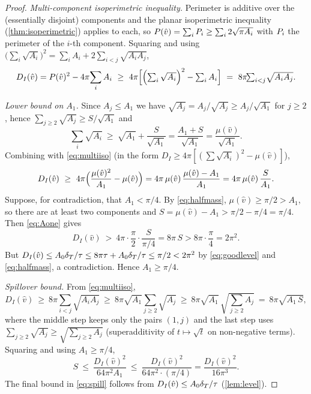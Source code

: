 \begin{proof}
\emph{Multi-component isoperimetric inequality.} Perimeter is additive over
the (essentially disjoint) components and the planar isoperimetric
inequality (\cref{thm:isoperimetric}) applies to each, so
$P(\hat v)=\sum_iP_i\ge\sum_i 2\sqrt{\pi A_i}$ with $P_i$ the
perimeter of the $i$-th component. Squaring and using
$\bigl(\sum_i\sqrt{A_i}\bigr)^2=\sum_iA_i+2\sum_{i<j}\sqrt{A_iA_j}$,
\begin{equation}\label{eq:multiiso}
   D_I(\hat v)=\Per(\hat v)^2-4\pi\!\sum_iA_i
   \ \ge\ 4\pi\Bigl[\Bigl(\textstyle\sum_i\sqrt{A_i}\Bigr)^2-\sum_iA_i\Bigr]
   \ =\ 8\pi\!\!\sum_{i<j}\!\sqrt{A_iA_j}.
\end{equation}

\emph{Lower bound on $A_1$.} Since $A_j\le A_1$ we have
$\sqrt{A_j}=A_j/\sqrt{A_j}\ge A_j/\sqrt{A_1}$ for $j\ge2$, hence
$\sum_{j\ge2}\sqrt{A_j}\ge S/\sqrt{A_1}$ and
\[
   \sum_i\sqrt{A_i}\ \ge\ \sqrt{A_1}+\frac{S}{\sqrt{A_1}}
   =\frac{A_1+S}{\sqrt{A_1}}=\frac{\mu(\hat v)}{\sqrt{A_1}}.
\]
Combining with \eqref{eq:multiiso} (in the form $D_I\ge4\pi[(\sum\sqrt{A_i})^2
-\mu(\hat v)]$),
\begin{equation}\label{eq:Aone}
   D_I(\hat v)\ \ge\ 4\pi\Bigl(\frac{\mu(\hat v)^2}{A_1}-\mu(\hat v)\Bigr)
   =4\pi\,\mu(\hat v)\,\frac{\mu(\hat v)-A_1}{A_1}
   =4\pi\,\mu(\hat v)\,\frac{S}{A_1}.
\end{equation}
Suppose, for contradiction, that $A_1<\pi/4$. By \eqref{eq:halfmass},
$\mu(\hat v)\ge\pi/2>A_1$, so there are at least two components and
$S=\mu(\hat v)-A_1>\pi/2-\pi/4=\pi/4$. Then \eqref{eq:Aone} gives
\[
   D_I(\hat v)\ >\ 4\pi\cdot\frac\pi2\cdot\frac{S}{\pi/4}=8\pi\,S>8\pi\cdot\frac\pi4=2\pi^2.
\]
But $D_I(\hat v)\le A_0\delta_T/\tau\le8\pi\tau+A_0\delta_T/\tau\le\pi/2<2\pi^2$ by
\eqref{eq:goodlevel} and \eqref{eq:halfmass}, a contradiction. Hence
$A_1\ge\pi/4$.

\emph{Spillover bound.} From \eqref{eq:multiiso},
\[
   D_I(\hat v)\ \ge\ 8\pi\!\sum_{i<j}\!\sqrt{A_iA_j}
   \ \ge\ 8\pi\sqrt{A_1}\sum_{j\ge2}\sqrt{A_j}
   \ \ge\ 8\pi\sqrt{A_1}\,\sqrt{\textstyle\sum_{j\ge2}A_j}
   \ =\ 8\pi\sqrt{A_1\,S},
\]
where the middle step keeps only the pairs $(1,j)$ and the last step uses
$\sum_{j\ge2}\sqrt{A_j}\ge\sqrt{\sum_{j\ge2}A_j}$ (superadditivity of
$t\mapsto\sqrt t$ on non-negative terms). Squaring and using $A_1\ge\pi/4$,
\[
   S\ \le\ \frac{D_I(\hat v)^2}{64\pi^2A_1}
   \ \le\ \frac{D_I(\hat v)^2}{64\pi^2\cdot(\pi/4)}
   =\frac{D_I(\hat v)^2}{16\pi^3}.
\]
The final bound in \eqref{eq:spill} follows from
$D_I(\hat v)\le A_0\delta_T/\tau$ (\cref{lem:level}).
\end{proof}

